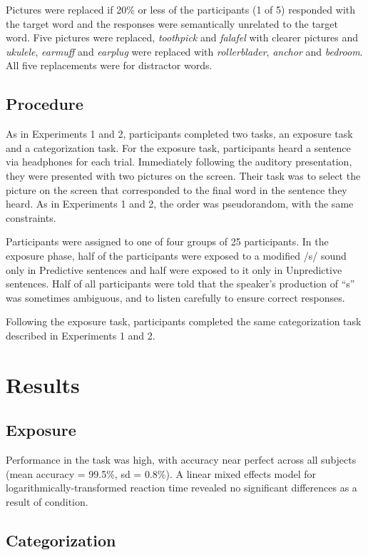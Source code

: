 Pictures were replaced if 20\% or less of the participants (1 of 5) responded with the target word and the responses were semantically unrelated to the target word. 
Five pictures were replaced, \emph{toothpick} and \emph{falafel} with clearer pictures and \emph{ukulele}, \emph{earmuff} and \emph{earplug} were replaced with \emph{rollerblader}, \emph{anchor} and \emph{bedroom}.  
All five replacements were for distractor words.

\subsection{Procedure}

As in Experiments 1 and 2, participants completed two tasks, an exposure task and a categorization task.  For the exposure task, participants heard a sentence via headphones for each trial.  Immediately following the auditory presentation, they were presented with two pictures on the screen.  Their task was to select the picture on the screen that corresponded to the final word in the sentence they heard.  As in Experiments 1 and 2, the order was pseudorandom, with the same constraints.

Participants were assigned to one of four groups of 25 participants.  
In the exposure phase, half of the participants were exposed to a modified /s/ sound only in Predictive sentences and half were exposed to it only in Unpredictive sentences.  
Half of all participants were told that the speaker's production of ``s'' was sometimes ambiguous, and to listen carefully to ensure correct responses.  

Following the exposure task, participants completed the same categorization task described in Experiments 1 and 2.

\section{Results}

\subsection{Exposure}

Performance in the task was high, with accuracy near perfect across all subjects (mean accuracy = 99.5\%, sd = 0.8\%).  A linear mixed effects model for logarithmically-transformed reaction time revealed no significant differences as a result of condition.

\subsection{Categorization}

